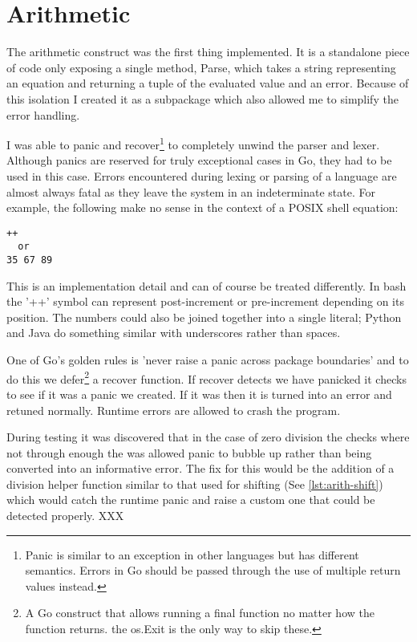 \section{Arithmetic}
The arithmetic construct was the first thing implemented.
It is a standalone piece of code only exposing a single method, Parse, which takes a string representing an equation and returning a tuple of the evaluated value and an error.
Because of this isolation I created it as a subpackage which also allowed me to simplify the error handling.

I was able to panic and recover\footnote{Panic is similar to an exception in other languages but has different semantics. Errors in Go should be passed through the use of multiple return values instead.} to completely unwind the parser and lexer.
Although panics are reserved for truly exceptional cases in Go, they had to be used in this case.
Errors encountered during lexing or parsing of a language are almost always fatal as they leave the system in an indeterminate state.
For example, the following make no sense in the context of a POSIX shell equation:
\begin{verbatim}
++
  or
35 67 89
\end{verbatim}
This is an implementation detail and can of course be treated differently.
In bash the '++' symbol can represent post-increment or pre-increment depending on its position.
The numbers could also be joined together into a single literal; Python and Java do something similar with underscores rather than spaces\cite{UNDERSCORE-NUM-LITERAL}.

One of Go's golden rules is 'never raise a panic across package boundaries' and to do this we defer\footnote{A Go construct that allows running a final function no matter how the function returns. the os.Exit is the only way to skip these.} a recover function.
If recover detects we have panicked it checks to see if it was a panic we created.
If it was then it is turned into an error and retuned normally. 
Runtime errors are allowed to crash the program.

During testing it was discovered that in the case of zero division the checks where not through enough the was allowed panic to bubble up rather than being converted into an informative error. 
The fix for this would be the addition of a division helper function similar to that used for shifting (See \ref{lst:arith-shift}) which would catch the runtime panic and raise a custom one that could be detected properly. XXX %

